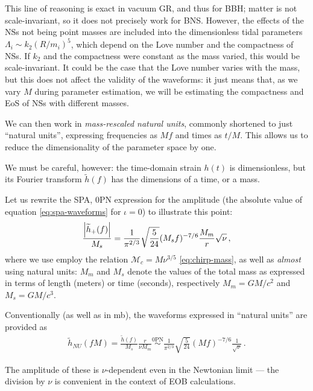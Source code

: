 \documentclass[main.tex]{subfiles}
\begin{document}
This line of reasoning is exact in vacuum GR, and thus for \ac{BBH}; matter is not scale-invariant, so it does not precisely work for \ac{BNS}. 
However, the effects of the \acp{NS} not being point masses are included into the dimensionless tidal parameters \(\Lambda_i \sim k_2 (R/m_i)^{5}\), which depend on the Love number and the compactness of \acp{NS}. If \(k_2 \) and the compactness were constant as the mass varied, this would be scale-invariant. 
It could be the case that the Love number varies with the mass, but this does not affect the validity of the waveforms: it just means that, as we vary \(M\) during parameter estimation, we will be estimating the compactness and \ac{EoS} of \acp{NS} with different masses. 

We can then work in \emph{mass-rescaled natural units}, commonly shortened to just ``natural units'', expressing frequencies as \(Mf\) and times as \(t / M\). This allows us to reduce the dimensionality of the parameter space by one. 

We must be careful, however: the time-domain strain \(h(t)\) is dimensionless, but its Fourier transform \(\widetilde{h}(f)\) has the dimensions of a time, or a mass.

Let us rewrite the \ac{SPA}, 0PN expression for the amplitude (the absolute value of equation \ref{eq:spa-waveforms} for \(\iota = 0\)) to illustrate this point: 
%
\begin{align}
\frac{\abs{\widetilde{h}_+ (f)}}{M_s} = \frac{1}{\pi^{2/3}} \sqrt{ \frac{5}{24}}
(M_s f)^{-7/6} \frac{M_m}{r} \sqrt{\nu }
\,,
\end{align}
%
where we use employ the relation \(\mathcal{M}_c = M \nu^{3/5}\) \eqref{eq:chirp-mass}, as well as \emph{almost} using natural units: \(M_m\) and \(M_s\) denote the values of the total mass as expressed in terms of length (meters) or time (seconds), respectively \(M_m = GM / c^2\) and \(M_s = GM / c^3\).

Conventionally (as well as in \ac{mb}), the waveforms expressed in ``natural units'' are provided as 
%
\begin{align}
\widetilde{h}_{NU} (fM) = \frac{\widetilde{h}(f)}{M_s} \frac{r}{\nu M_m} \overset{\text{0PN}}{\sim} \frac{1}{\pi^{2/3}} \sqrt{ \frac{5}{24}} (Mf)^{-7/6} \frac{1}{\sqrt{ \nu }}
\,.
\end{align}

The amplitude of these is  \(\nu \)-dependent even in the Newtonian limit --- the division by \(\nu \) is convenient in the context of \ac{EOB} calculations. 
\end{document}
